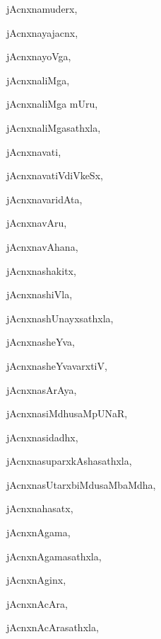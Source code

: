 \begin{multicols}{3}
{\noindent
{jAcnxnamuderx}, \pageref{jAcnxnamuderx}

\noindent
{jAcnxnayajacnx}, \pageref{jAcnxnayajacnx}

\noindent
{jAcnxnayoVga}, \pageref{jAcnxnayoVga}

\noindent
{jAcnxnaliMga}, \pageref{jAcnxnaliMga}

\noindent
{jAcnxnaliMga mUru}, \pageref{jAcnxnaliMga mUru}

\noindent
{jAcnxnaliMgasathxla}, \pageref{jAcnxnaliMgasathxla}

\noindent
{jAcnxnavati}, \pageref{jAcnxnavati}

\noindent
{jAcnxnavatiVdiVkeSx}, \pageref{jAcnxnavatiVdiVkeSx}

\noindent
{jAcnxnavaridAta}, \pageref{jAcnxnavaridAta}

\noindent
{jAcnxnavAru}, \pageref{jAcnxnavAru}

\noindent
{jAcnxnavAhana}, \pageref{jAcnxnavAhana}

\noindent
{jAcnxnashakitx}, \pageref{jAcnxnashakitx}

\noindent
{jAcnxnashiVla}, \pageref{jAcnxnashiVla}

\noindent
{jAcnxnashUnayxsathxla}, \pageref{jAcnxnashUnayxsathxla}

\noindent
{jAcnxnasheYva}, \pageref{jAcnxnasheYva}

\noindent
{jAcnxnasheYvavarxtiV}, \pageref{jAcnxnasheYvavarxtiV}

\noindent
{jAcnxnasArAya}, \pageref{jAcnxnasArAya}

\noindent
{jAcnxnasiMdhusaMpUNaR}, \pageref{jAcnxnasiMdhusaMpUNaR}

\noindent
{jAcnxnasidadhx}, \pageref{jAcnxnasidadhx}

\noindent
{jAcnxnasuparxkAshasathxla}, \pageref{jAcnxnasuparxkAshasathxla}

\noindent
{jAcnxnasUtarxbiMdusaMbaMdha}, \pageref{jAcnxnasUtarxbiMdusaMbaMdha}

\noindent
{jAcnxnahasatx}, \pageref{jAcnxnahasatx}

\noindent
{jAcnxnAgama}, \pageref{jAcnxnAgama}

\noindent
{jAcnxnAgamasathxla}, \pageref{jAcnxnAgamasathxla}

\noindent
{jAcnxnAginx}, \pageref{jAcnxnAginx}

\noindent
{jAcnxnAcAra}, \pageref{jAcnxnAcAra}

\noindent
{jAcnxnAcArasathxla}, \pageref{jAcnxnAcArasathxla}

}
\end{multicols}
